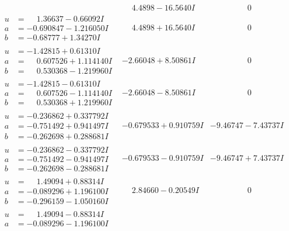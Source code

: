 \documentclass[1p]{elsarticle_modified}
\theoremstyle{definition}
\begin{document}
$$\begin{array}{c|c|c}
 & \phantom{-}4.4898 - 16.5640 I & \phantom{-0.000000 } 0 \\ \hline\begin{aligned}
u &= \phantom{-}1.36637 - 0.66092 I \\
a &= -0.690847 - 1.216050 I \\
b &= -0.68777 + 1.34270 I\end{aligned}
 & \phantom{-}4.4898 + 16.5640 I & \phantom{-0.000000 } 0 \\ \hline\begin{aligned}
u &= -1.42815 + 0.61310 I \\
a &= \phantom{-}0.607526 + 1.114140 I \\
b &= \phantom{-}0.530368 - 1.219960 I\end{aligned}
 & -2.66048 + 8.50861 I & \phantom{-0.000000 } 0 \\ \hline\begin{aligned}
u &= -1.42815 - 0.61310 I \\
a &= \phantom{-}0.607526 - 1.114140 I \\
b &= \phantom{-}0.530368 + 1.219960 I\end{aligned}
 & -2.66048 - 8.50861 I & \phantom{-0.000000 } 0 \\ \hline\begin{aligned}
u &= -0.236862 + 0.337792 I \\
a &= -0.751492 + 0.941497 I \\
b &= -0.262698 + 0.288681 I\end{aligned}
 & -0.679533 + 0.910759 I & -9.46747 - 7.43737 I \\ \hline\begin{aligned}
u &= -0.236862 - 0.337792 I \\
a &= -0.751492 - 0.941497 I \\
b &= -0.262698 - 0.288681 I\end{aligned}
 & -0.679533 - 0.910759 I & -9.46747 + 7.43737 I \\ \hline\begin{aligned}
u &= \phantom{-}1.49094 + 0.88314 I \\
a &= -0.089296 + 1.196100 I \\
b &= -0.296159 - 1.050160 I\end{aligned}
 & \phantom{-}2.84660 - 0.20549 I & \phantom{-0.000000 } 0 \\ \hline\begin{aligned}
u &= \phantom{-}1.49094 - 0.88314 I \\
a &= -0.089296 - 1.196100 I \\

\end{aligned}
\end{array}$$
\end{document}
